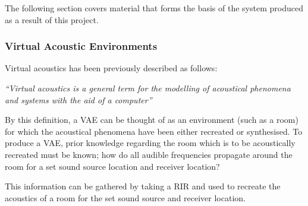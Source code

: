 \documentclass[../../main.tex]{subfiles}
\begin{document}
	The following section covers material that forms the basis of the system produced as a result of this project.



	\subsubsection{Virtual Acoustic Environments}

		 Virtual acoustics has been previously described \cite{Huopaniemi2000} as follows: 

		 \vspace{5mm}
		 \begin{center}
		 \begin{minipage}{0.5\textwidth}
		 \textit{``Virtual acoustics is a general term for the modelling of acoustical phenomena and systems with the aid of a computer''}
		 \end{minipage}
		 \end{center}
		 \vspace{5mm}

		By this definition, a \ac{VAE} can be thought of as an environment (such as a room) for which the acoustical phenomena have been either recreated or synthesised. To produce a \ac{VAE}, prior knowledge regarding the room which is to be acoustically recreated must be known; how do all audible frequencies propagate around the room for a set sound source location and receiver location?

		This information can be gathered by taking a \ac{RIR} and used to recreate the acoustics of a room for the set sound source and receiver location.



\end{document}
